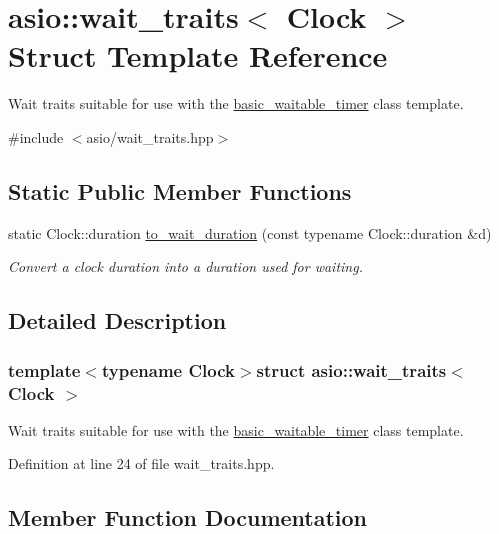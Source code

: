 \hypertarget{structasio_1_1wait__traits}{}\section{asio\+:\+:wait\+\_\+traits$<$ Clock $>$ Struct Template Reference}
\label{structasio_1_1wait__traits}


Wait traits suitable for use with the \hyperlink{classasio_1_1basic__waitable__timer}{basic\+\_\+waitable\+\_\+timer} class template.  




{\ttfamily \#include $<$asio/wait\+\_\+traits.\+hpp$>$}

\subsection*{Static Public Member Functions}
\begin{DoxyCompactItemize}
\item 
static Clock\+::duration \hyperlink{structasio_1_1wait__traits_a4f9aab5eb455822363961e7597de0dd2}{to\+\_\+wait\+\_\+duration} (const typename Clock\+::duration \&d)
\begin{DoxyCompactList}\small\item\em Convert a clock duration into a duration used for waiting. \end{DoxyCompactList}\end{DoxyCompactItemize}


\subsection{Detailed Description}
\subsubsection*{template$<$typename Clock$>$struct asio\+::wait\+\_\+traits$<$ Clock $>$}

Wait traits suitable for use with the \hyperlink{classasio_1_1basic__waitable__timer}{basic\+\_\+waitable\+\_\+timer} class template. 

Definition at line 24 of file wait\+\_\+traits.\+hpp.



\subsection{Member Function Documentation}
\hypertarget{structasio_1_1wait__traits_a4f9aab5eb455822363961e7597de0dd2}{}
